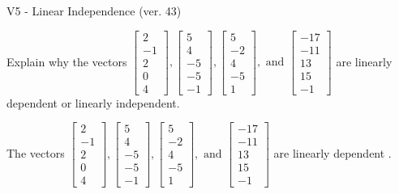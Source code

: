 \begin{exercise}
  \begin{exerciseTitle}V5 - Linear Independence (ver. 43)\end{exerciseTitle}
  \begin{exerciseStatement}
    Explain why the vectors \(\left[\begin{array}{r}
2 \\
-1 \\
2 \\
0 \\
4
\end{array}\right] , \left[\begin{array}{r}
5 \\
4 \\
-5 \\
-5 \\
-1
\end{array}\right] , \left[\begin{array}{r}
5 \\
-2 \\
4 \\
-5 \\
1
\end{array}\right] , \text{ and } \left[\begin{array}{r}
-17 \\
-11 \\
13 \\
15 \\
-1
\end{array}\right]\) are linearly dependent or linearly independent.	


  \end{exerciseStatement}
  \begin{exerciseAnswer}
   The vectors \(\left[\begin{array}{r}
2 \\
-1 \\
2 \\
0 \\
4
\end{array}\right] , \left[\begin{array}{r}
5 \\
4 \\
-5 \\
-5 \\
-1
\end{array}\right] , \left[\begin{array}{r}
5 \\
-2 \\
4 \\
-5 \\
1
\end{array}\right] , \text{ and } \left[\begin{array}{r}
-17 \\
-11 \\
13 \\
15 \\
-1
\end{array}\right]\) are 
  	 linearly dependent  .
  


  \end{exerciseAnswer}
\end{exercise}